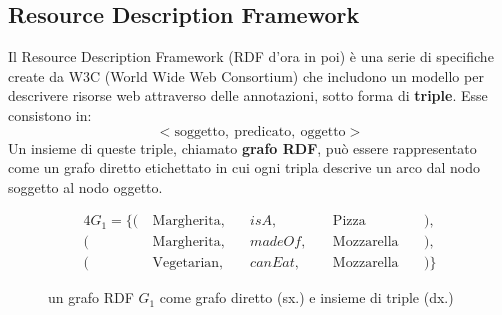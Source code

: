 \subsection[Resource Description Framework]{Resource Description Framework}
Il Resource Description Framework \cite{RDFspecification} (RDF d'ora in poi) è una serie di specifiche create da W3C (World Wide Web Consortium) che includono un modello per descrivere risorse web attraverso delle annotazioni, sotto forma di \textbf{triple}. Esse consistono in:
\[ < \text{soggetto},\ \text{predicato},\ \text{oggetto} > \]
Un insieme di queste triple, chiamato \textbf{grafo RDF}, può essere rappresentato come un grafo diretto etichettato in cui ogni tripla descrive un arco dal nodo soggetto al nodo oggetto.
\begin{figure}[h]
    \begin{minipage}{0.3\linewidth}
        \centering
    \end{minipage}
    \hspace{5mm}
    \begin{minipage}{0.7\linewidth}
        \begin{alignat*}{4}
            G_1 = \{ (\  & \text{Margherita},\  &  & isA,      &  & \text{Pizza}        &  & ),  \\
            (\           & \text{Margherita},\  &  & madeOf,\  &  & \text{Mozzarella}\  &  & ),  \\
            (\           & \text{Vegetarian},\  &  & canEat,\  &  & \text{Mozzarella}\  &  & )\}
        \end{alignat*}
    \end{minipage}
    \caption{un grafo RDF $G_1$ come grafo diretto (sx.) e insieme di triple (dx.)}
    \label{fig:grafoRDF}
\end{figure}

